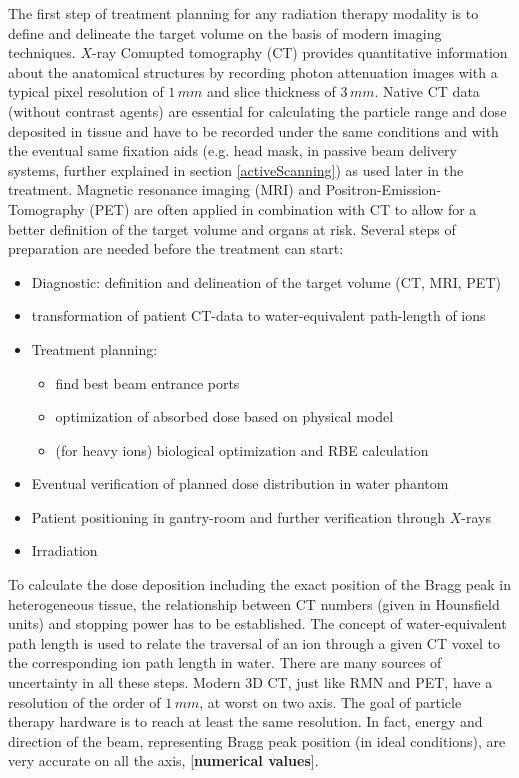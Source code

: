 \documentclass[12pt, a4paper, twoside]{book}
\begin{document}
The first step of treatment planning for any radiation therapy modality is to define and delineate the target volume on the basis of modern imaging techniques. $X$-ray Comupted tomography (CT) provides quantitative information about the anatomical structures by recording photon attenuation images with a typical pixel resolution of $1\,mm$ and slice thickness of $3\,mm$. Native CT data (without contrast agents) are essential for calculating the particle range and dose deposited in tissue and have to be recorded under the same conditions and with the eventual same fixation aids (e.g. head mask, in passive beam delivery systems, further explained in section \ref{activeScanning}) as used later in the treatment. Magnetic resonance imaging (MRI) and Positron-Emission-Tomography (PET) are often applied in combination with CT to allow for a better definition of the target volume and organs at risk.
Several steps of preparation are needed before the treatment can start:
\begin{itemize}
\item Diagnostic: definition and delineation of the target volume (CT, MRI, PET)
\item transformation of patient CT-data to water-equivalent path-length of ions
\item Treatment planning:
	\begin{itemize}
	\item find best beam entrance ports
	\item optimization of absorbed dose based on physical model
	\item (for heavy ions) biological optimization and RBE calculation
	\end{itemize}
\item Eventual verification of planned dose distribution in water phantom
\item Patient positioning in gantry-room and further verification through $X$-rays
\item Irradiation
\end{itemize}
To calculate the dose deposition including the exact position of the Bragg peak in heterogeneous tissue, the relationship between CT numbers (given in Hounsfield units) and stopping power has to be established. The concept of water-equivalent path length is used to relate the traversal of an ion through a given CT voxel to the corresponding ion path length in water.
There are many sources of uncertainty in all these steps.
Modern 3D CT, just like RMN and PET, have a resolution of the order of $1\,mm$, at worst on two axis. The goal of particle therapy hardware is to reach at least the same resolution. In fact, energy and direction of the beam, representing Bragg peak position (in ideal conditions), are very accurate on all the axis, [\textbf{numerical values}].
\end{document}

